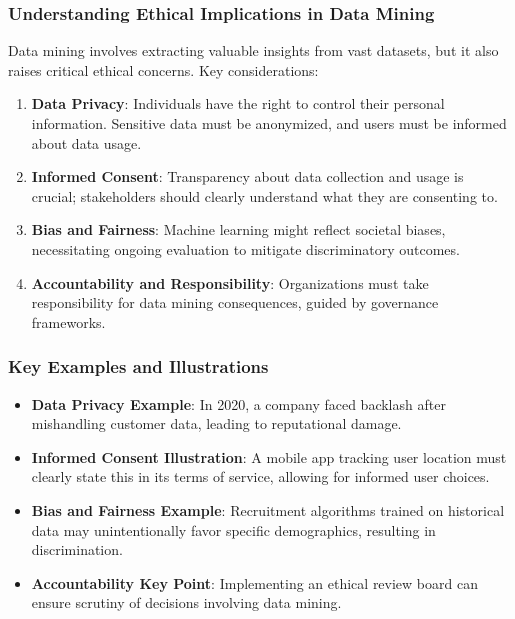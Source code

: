 \documentclass[aspectratio=169]{beamer}
\begin{document}
\begin{frame}[fragile]
    \frametitle{Understanding Ethical Implications in Data Mining}
    Data mining involves extracting valuable insights from vast datasets, but it also raises critical ethical concerns. Key considerations:
    \begin{enumerate}
        \item \textbf{Data Privacy}: Individuals have the right to control their personal information. Sensitive data must be anonymized, and users must be informed about data usage.
        \item \textbf{Informed Consent}: Transparency about data collection and usage is crucial; stakeholders should clearly understand what they are consenting to.
        \item \textbf{Bias and Fairness}: Machine learning might reflect societal biases, necessitating ongoing evaluation to mitigate discriminatory outcomes.
        \item \textbf{Accountability and Responsibility}: Organizations must take responsibility for data mining consequences, guided by governance frameworks.
    \end{enumerate}
\end{frame}

\begin{frame}[fragile]
    \frametitle{Key Examples and Illustrations}
    \begin{itemize}
        \item \textbf{Data Privacy Example}:
          In 2020, a company faced backlash after mishandling customer data, leading to reputational damage.
          
        \item \textbf{Informed Consent Illustration}:
          A mobile app tracking user location must clearly state this in its terms of service, allowing for informed user choices.
          
        \item \textbf{Bias and Fairness Example}:
          Recruitment algorithms trained on historical data may unintentionally favor specific demographics, resulting in discrimination.
          
        \item \textbf{Accountability Key Point}:
          Implementing an ethical review board can ensure scrutiny of decisions involving data mining.
    \end{itemize}
\end{frame}
\end{document}
